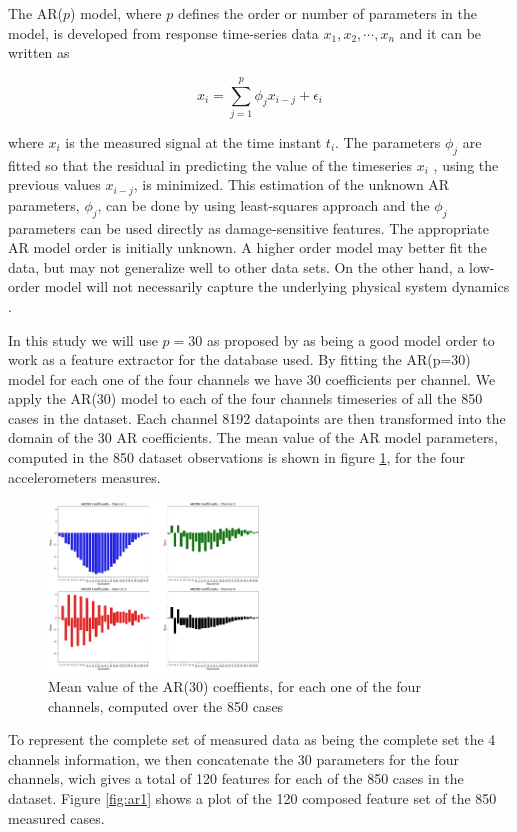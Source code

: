 \documentclass[twocolumn]{article}
\begin{document}
The AR($p$) model, where $p$ defines the order or number of parameters in the model, is developed from
response time-series data $x_1, x_2, \cdots, x_n$ and it can be written as

\[x_i = \sum_{j=1}^{p} \phi_j x_{i-j} + \epsilon_i\]

where $x_i$ is the measured signal at the time instant $t_i$. The parameters $\phi_j$ are fitted so that the residual in predicting the value of the timeseries $x_i$ , using the previous values $x_{i-j}$, is minimized. This estimation of the unknown AR parameters, $\phi_j$, can be done by using least-squares approach and the $\phi_j$ parameters can be used directly as damage-sensitive features. The appropriate AR model order is initially unknown. A higher order model may better fit the data, but may not generalize well to other data sets. On the other hand, a low-order model will not necessarily capture the underlying physical system dynamics \cite{autoreg}.

In this study we will use $p=30$ as proposed by \cite{autoreg} as being a good model order to work as a feature extractor for the database used. By fitting the AR(p=30) model for each one of the four channels we have 30 coefficients per channel. We apply the AR(30) model to each of the four channels timeseries of all the 850 cases in the dataset. Each channel 8192 datapoints are then transformed into the domain of the 30 AR coefficients. The mean value of the AR model parameters, computed in the 850 dataset observations is shown in figure \ref{fig:ar0}, for the four accelerometers measures.

\begin{figure}[H]
      \centering
      \includegraphics[width=0.5\textwidth]{ar_0.png}
      \caption{Mean value of the AR(30) coeffients, for each one of the four channels, computed over the 850 cases}
      \label{fig:ar0}
\end{figure}

To represent the complete set of measured data as being the complete set the 4 channels information, we then concatenate the 30 parameters for the four channels, wich gives a total of 120 features for each of the 850 cases in the dataset. Figure \ref{fig:ar1} shows a plot of the 120 composed feature set of the 850 measured cases.
\end{document}
